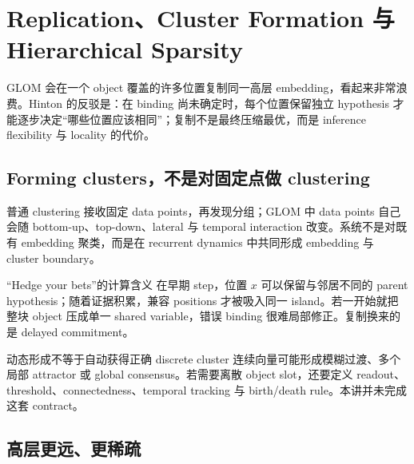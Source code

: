 \section{Replication、Cluster Formation 与 Hierarchical Sparsity}

GLOM 会在一个 object 覆盖的许多位置复制同一高层 embedding，看起来非常浪费。Hinton 的反驳是：在 binding 尚未确定时，每个位置保留独立 hypothesis 才能逐步决定“哪些位置应该相同”；复制不是最终压缩最优，而是 inference flexibility 与 locality 的代价。



\subsection{Forming clusters，不是对固定点做 clustering}

普通 clustering 接收固定 data points，再发现分组；GLOM 中 data points 自己会随 bottom-up、top-down、lateral 与 temporal interaction 改变。系统不是对既有 embedding 聚类，而是在 recurrent dynamics 中共同形成 embedding 与 cluster boundary。

\begin{importantbox}{“Hedge your bets”的计算含义}
在早期 step，位置 $x$ 可以保留与邻居不同的 parent hypothesis；随着证据积累，兼容 positions 才被吸入同一 island。若一开始就把整块 object 压成单一 shared variable，错误 binding 很难局部修正。复制换来的是 delayed commitment。
\end{importantbox}

\begin{warningbox}{动态形成不等于自动获得正确 discrete cluster}
连续向量可能形成模糊过渡、多个局部 attractor 或 global consensus。若需要离散 object slot，还要定义 readout、threshold、connectedness、temporal tracking 与 birth/death rule。本讲并未完成这套 contract。
\end{warningbox}

\subsection{高层更远、更稀疏}

